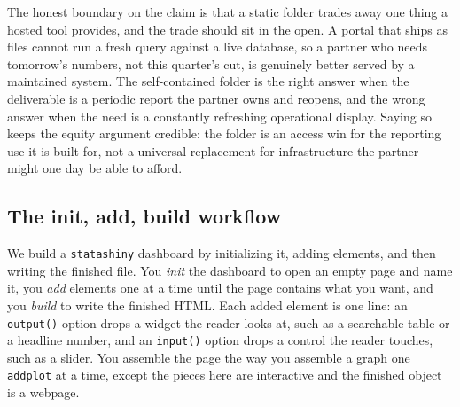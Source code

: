 \documentclass[
    a4paper,
    fontsize=10pt,
    twoside=true,
    numbers=noenddot,
]{kaobook}
\begin{document}
The honest boundary on the claim is that a static folder trades away one thing a hosted tool provides, and the trade should sit in the open. A portal that ships as files cannot run a fresh query against a live database, so a partner who needs tomorrow's numbers, not this quarter's cut, is genuinely better served by a maintained system. The self-contained folder is the right answer when the deliverable is a periodic report the partner owns and reopens, and the wrong answer when the need is a constantly refreshing operational display. Saying so keeps the equity argument credible: the folder is an access win for the reporting use it is built for, not a universal replacement for infrastructure the partner might one day be able to afford.

\subsection{The init, add, build workflow}
We build a \texttt{statashiny} dashboard by initializing it, adding elements, and then writing the finished file. You \emph{init} the dashboard to open an empty page and name it, you \emph{add} elements one at a time until the page contains what you want, and you \emph{build} to write the finished HTML. Each added element is one line: an \texttt{output()} option drops a widget the reader looks at, such as a searchable table or a headline number, and an \texttt{input()} option drops a control the reader touches, such as a slider. You assemble the page the way you assemble a graph one \texttt{addplot} at a time, except the pieces here are interactive and the finished object is a webpage.
\end{document}
